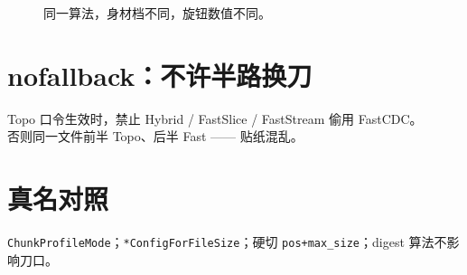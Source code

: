 \begin{figure}[htbp]
\centering
{}
\caption{同一算法，身材档不同，旋钮数值不同。}
\label{fig:profile-sizes}
\end{figure}

\section{nofallback：不许半路换刀}

\begin{pitfall}[Hybrid 回退]
Topo 口令生效时，禁止 Hybrid / FastSlice / FastStream 偷用 FastCDC。\\
否则同一文件前半 Topo、后半 Fast —— 贴纸混乱。
\end{pitfall}

\section{真名对照}

\texttt{ChunkProfileMode}；\texttt{*ConfigForFileSize}；硬切 \texttt{pos+max\_size}；digest 算法不影响刀口。
